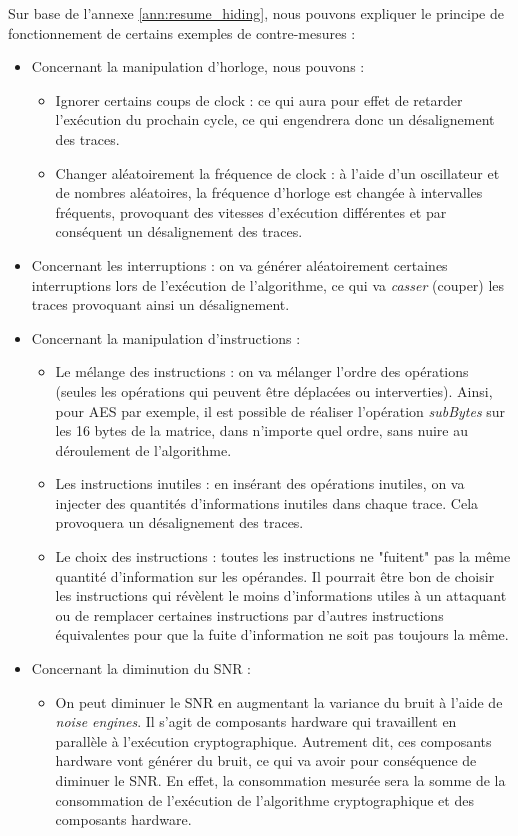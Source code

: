 \documentclass[oneside]{book}
\begin{document}
\hspace{-0.5 cm}Sur base de l'annexe \ref{ann:resume_hiding}, nous pouvons expliquer le principe de fonctionnement de certains exemples de contre-mesures :
\begin{itemize}
\item Concernant la manipulation d’horloge, nous pouvons :
\begin{itemize}
\item Ignorer certains coups de clock : ce qui aura pour effet de retarder l’exécution du prochain cycle, ce qui engendrera donc un désalignement des traces.
\item Changer aléatoirement la fréquence de clock : à l’aide d’un oscillateur et de nombres aléatoires, la fréquence d’horloge est changée à intervalles fréquents, provoquant des vitesses d’exécution différentes et par conséquent un désalignement des traces.
\end{itemize}
\item Concernant les interruptions : on va générer aléatoirement certaines interruptions lors de l'exécution de l'algorithme, ce qui va \textit{casser} (couper) les traces provoquant ainsi un désalignement.
\item Concernant la manipulation d'instructions : 
\begin{itemize}
\item Le mélange des instructions : on va mélanger l’ordre des opérations (seules les opérations qui peuvent être déplacées ou interverties). Ainsi, pour AES par exemple, il est possible de réaliser l’opération \textit{subBytes} sur les 16 bytes de la matrice, dans n’importe quel ordre, sans nuire au déroulement de l’algorithme.
\item Les instructions inutiles : en insérant des opérations inutiles, on va injecter des quantités d'informations inutiles dans chaque trace. Cela provoquera un désalignement des traces.
\item Le choix des instructions : toutes les instructions ne "fuitent" pas la même quantité d’information sur les opérandes. Il pourrait être bon de choisir les instructions qui révèlent le moins d’informations utiles à un attaquant ou de remplacer certaines instructions par d’autres instructions équivalentes pour que la fuite d’information ne soit pas toujours la même.
\end{itemize}
\item Concernant la diminution du SNR :
\begin{itemize}
\item On peut diminuer le SNR en augmentant la variance du bruit à l'aide de \textit{noise engines}. Il s'agit de composants hardware qui travaillent en parallèle à l’exécution cryptographique. Autrement dit, ces composants hardware vont générer du bruit, ce qui va avoir pour conséquence de diminuer le SNR. En effet, la consommation mesurée sera la somme de la consommation de l’exécution de l’algorithme cryptographique et des composants hardware.

\end{itemize}
\end{itemize}
\end{document}
